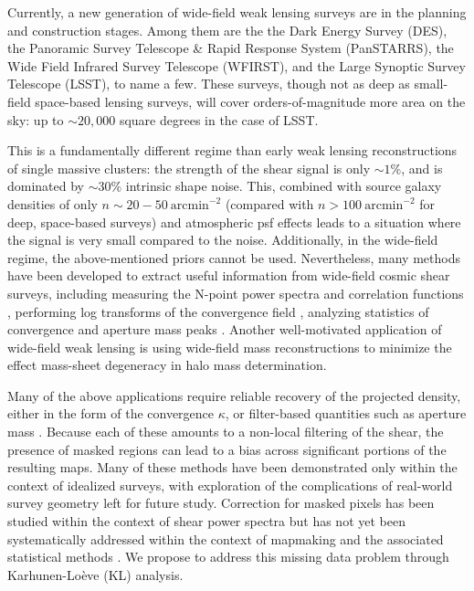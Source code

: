 \documentclass[twocolumn]{emulateapj}
\begin{document}
Currently, a new generation of wide-field weak lensing surveys are
in the planning and construction stages.  
Among them are the the Dark Energy Survey (DES), 
the Panoramic Survey Telescope \& Rapid
Response System (PanSTARRS), the Wide Field Infrared Survey Telescope (WFIRST),
and the Large Synoptic Survey Telescope (LSST), to name a few.
These surveys, though not as deep as small-field space-based lensing surveys,
will cover orders-of-magnitude more area on the sky: up to $\sim 20,000$
square degrees in the case of LSST.

This is a fundamentally different regime 
than early weak lensing reconstructions
of single massive clusters: the strength of the shear signal is only
$\sim 1$\%, and is dominated by $\sim 30$\% intrinsic shape noise.  
This, combined with source galaxy densities of only 
$n \sim 20-50\ \mathrm{arcmin}^{-2}$
(compared with $n > 100\ \mathrm{arcmin}^{-2}$ for deep, space-based surveys)
and atmospheric psf effects leads to a situation where the signal is 
very small compared to the noise.  
Additionally, in the wide-field regime,
the above-mentioned priors cannot be used.  
Nevertheless, many methods have been developed to extract useful
information from wide-field cosmic shear surveys, including
measuring the N-point power spectra and correlation functions 
\citep{Schneider02,Takada04,Hikage10}, 
performing log transforms of the convergence field 
\citep{Neyrinck09,Neyrinck10,Scherrer10,Seo11},
analyzing statistics of convergence and aperture mass peaks 
\citep{Marian10,Dietrich10,Schmidt10,Kratochvil10,Maturi11}.
Another well-motivated application of wide-field weak lensing 
is using wide-field mass reconstructions to minimize the effect
mass-sheet degeneracy in halo mass determination.

Many of the above applications require reliable recovery of 
the projected density, 
either in the form of the convergence $\kappa$, or filter-based quantities 
such as aperture mass \citep{Schneider98}.  
Because each of these amounts to a non-local filtering of the shear, 
the presence of masked regions can lead to a bias across significant
portions of the resulting maps.  Many of these methods have been demonstrated 
only within the context of idealized surveys, with exploration of the 
complications of real-world survey geometry left for future study.  
Correction for masked pixels has been studied within the context 
of shear power spectra \citep{Schneider10,Hikage10}
but has not yet been systematically addressed
within the context of mapmaking and the associated statistical methods
\citep[see, however,][for some possible approaches]{Padmanabhan03,Pires09}.
We propose to address this missing data problem through 
Karhunen-Lo\`{e}ve (KL) analysis.
\end{document}

